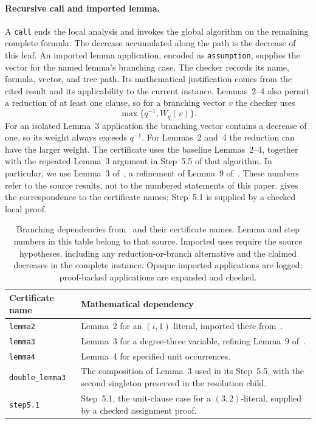\documentclass[11pt]{article}
\theoremstyle{definition}
\theoremstyle{remark}
\begin{document}
\paragraph{Recursive call and imported lemma.}
A \texttt{call} ends the local analysis and invokes the global algorithm on
the remaining complete formula. The decrease accumulated along the path is
the decrease of this leaf. An imported lemma application, encoded as
\texttt{assumption}, supplies the vector for the named lemma's branching
case. The checker records its name, formula, vector, and tree path. Its
mathematical justification comes from the cited result and its applicability
to the current instance. Lemmas~2--4 also permit a reduction of at least one
clause, so for a branching vector $v$ the checker uses
\begin{equation}
 \max\{q^{-1},W_q(v)\}.
 \label{eq:imported-lemma-weight}
\end{equation}
For an isolated Lemma~3 application the branching vector contains a decrease
of one, so its weight always exceeds $q^{-1}$. For Lemmas~2 and~4 the
reduction can have the larger weight. The certificate uses the baseline Lemmas~2--4,
together with the repeated Lemma~3 argument
in Step~5.5 of that algorithm. In particular, we use Lemma~3
of~\cite{Xiao2022}, a refinement of Lemma~9 of~\cite{XuEtAl2019}.
These numbers refer to the source results, not to the numbered statements
of this paper.  gives the correspondence to the
certificate names; Step~5.1 is supplied by a checked local proof.

\begin{table}[!htbp]
\centering\small
\begin{tabularx}{\linewidth}{@{}lX@{}}
\toprule
Certificate name & Mathematical dependency \\
\midrule
\texttt{lemma2} & Lemma~2 for an $(i,1)$ literal,
imported there from~\cite{XuEtAl2019}. \\
\texttt{lemma3} & Lemma~3 for a degree-three variable,
refining Lemma~9 of~\cite{XuEtAl2019}. \\
\texttt{lemma4} & Lemma~4 for specified unit occurrences. \\
\texttt{double\_lemma3} & The composition of Lemma~3
used in its Step~5.5,
with the second singleton preserved in the resolution child. \\
\texttt{step5.1} & Step~5.1, the unit-clause case for a
$(3,2)$-literal, supplied by a checked assignment proof. \\
\bottomrule
\end{tabularx}
\caption{Branching dependencies from~\cite{Xiao2022} and their certificate
names. Lemma and step numbers in this table belong to that source.
Imported uses require the source
hypotheses, including any reduction-or-branch alternative and the claimed
decreases in the complete instance. Opaque imported applications are logged;
proof-backed applications are expanded and checked.}
\label{tab:dependencies}
\end{table}
\end{document}

